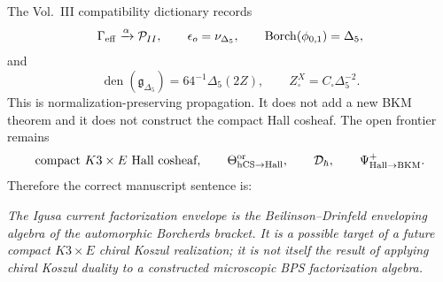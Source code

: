 \begin{remark}
\label{rem:vol3-koszul-compatibility}
The Vol.~III compatibility dictionary records
$$
\Gamma_{\mathrm{eff}}\xrightarrow{\alpha}\mathcal P_{II},\qquad
\epsilon_o=\nu_{\Delta_5},\qquad
\operatorname{Borch}(\phi_{0,1})=\Delta_5,
$$
and
$$
\operatorname{den}(\mathfrak g_{\Delta_5})=64^{-1}\Delta_5(2Z),
\qquad
Z^X_\square=C_\square\Delta_5^{-2}.
$$
This is normalization-preserving propagation.  It does not add a new BKM
theorem and it does not construct the compact Hall cosheaf.  The open
frontier remains
$$
\hbox{compact }K3\times E\hbox{ Hall cosheaf},\qquad
\Theta^{\mathrm{or}}_{\mathrm{hCS}\to\mathrm{Hall}},\qquad
\mathcal D_\hbar,\qquad
\Psi^+_{\mathrm{Hall}\to\mathrm{BKM}}.
$$
Therefore the correct manuscript sentence is:

\emph{The Igusa current factorization envelope is the Beilinson--Drinfeld
enveloping algebra of the automorphic Borcherds bracket.  It is a possible
target of a future compact \(K3\times E\) chiral Koszul realization; it is
not itself the result of applying chiral Koszul duality to a constructed
microscopic BPS factorization algebra.}
\end{remark}
